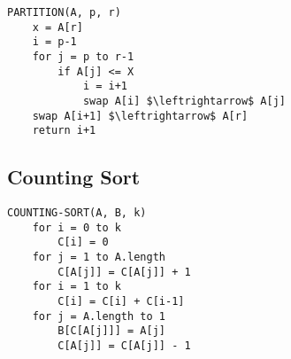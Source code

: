 \documentclass[10pt,a4paper]{article}
\begin{document}
\begin{multicols*}{2}
\begin{lstlisting}
PARTITION(A, p, r)
    x = A[r]
    i = p-1
    for j = p to r-1
        if A[j] <= X
            i = i+1
            swap A[i] $\leftrightarrow$ A[j]
    swap A[i+1] $\leftrightarrow$ A[r]
    return i+1
\end{lstlisting}
\subsection*{Counting Sort}
\begin{lstlisting}
COUNTING-SORT(A, B, k)
    for i = 0 to k
        C[i] = 0
    for j = 1 to A.length
        C[A[j]] = C[A[j]] + 1
    for i = 1 to k
        C[i] = C[i] + C[i-1]
    for j = A.length to 1
        B[C[A[j]]] = A[j]
        C[A[j]] = C[A[j]] - 1
\end{lstlisting}
\end{multicols*}

\pagebreak
\end{document}
